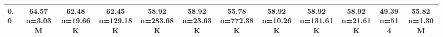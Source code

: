 \begin{table}
\begin{tabular}{lccccccccccc}
0.0 & \makecell{64.57 \\ \scriptsize n=3.03M} & \makecell{62.48 \\ \scriptsize n=19.66K} & \makecell{62.45 \\ \scriptsize n=129.18K} & \makecell{58.92 \\ \scriptsize n=283.68K} & \makecell{58.92 \\ \scriptsize n=23.63K} & \makecell{55.78 \\ \scriptsize n=772.38K} & \makecell{58.92 \\ \scriptsize n=10.26K} & \makecell{58.92 \\ \scriptsize n=131.61K} & \makecell{58.92 \\ \scriptsize n=21.61K} & \makecell{49.39 \\ \scriptsize n=514} & \makecell{55.82 \\ \scriptsize n=1.30M} \\
            \bottomrule
            \end{tabular}
            \label{tab:si-disruption-matrix-6}
            \end{table}